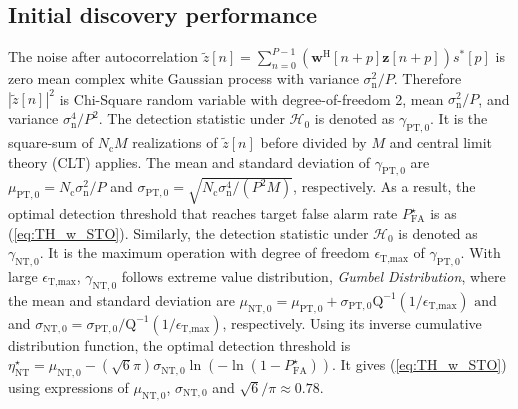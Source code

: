 \documentclass[journal]{IEEEtran}
\newcommand{\hermitian}[0]{\text{H}}
\newcommand{\Nc}[0]{N_{\text{c}}}
\newcommand{\sigman}[0]{\sigma_{\text{n}}}
\newcommand{\Q}[0]{\mathrm{Q}}
\begin{document}
\subsection{Initial discovery performance}
\label{appendix:detection_derivation_wo_STO}
The noise after autocorrelation $\tilde{z}[n] = \sum_{n=0}^{P-1}(\mathbf{w}^{\hermitian}[n+p]\mathbf{z}[n+p])s^{*}[p]$ is zero mean complex white Gaussian process with variance $\sigman^2/P$. Therefore $|\tilde{z}[n]|^2$ is Chi-Square random variable with degree-of-freedom 2, mean $\sigman^2/P$, and variance $\sigman^4/P^2$. The detection statistic under $\mathcal{H}_0$ is denoted as $\gamma_{\text{PT},0}$. It is the square-sum of $\Nc M$ realizations of $\tilde{z}[n]$ before divided by $M$ and central limit theory (CLT) applies. The mean and standard deviation of $\gamma_{\text{PT},0}$ are  $\mu_{\text{PT},0} =  \Nc\sigman^2/P$ and $\sigma_{\text{PT},0} =  \sqrt{\Nc\sigman^4/(P^2M)}$, respectively. As a result, the optimal detection threshold that reaches target false alarm rate $P^{\star}_{\text{FA}}$ is as (\ref{eq:TH_w_STO}). 
Similarly, the detection statistic under $\mathcal{H}_0$ is denoted as $\gamma_{\text{NT},0}$. It is the maximum operation with degree of freedom $\epsilon_{\text{T,max}}$ of $\gamma_{\text{PT},0}$. With large $\epsilon_{\text{T,max}}$, $\gamma_{\text{NT},0}$ follows extreme value distribution, \textit{Gumbel Distribution}, where the mean and standard deviation are 
$\mu_{\text{NT},0} = \mu_{\text{PT},0}+\sigma_{\text{PT},0}\Q^{-1}\left(1/\epsilon_{\text{T,max}}\right) \text{ and }$ and $\sigma_{\text{NT},0} = \sigma_{\text{PT},0}/\Q^{-1}\left(1/\epsilon_{\text{T,max}}\right)$, respectively.
Using its inverse cumulative distribution function, the optimal detection threshold is
$\eta^{\star}_{\text{NT}} = \mu_{\text{NT},0} - (\sqrt{6}\pi)\sigma_{\text{NT},0} \ln\left(-\ln\left(1-P^{\star}_{\text{FA}}\right)\right)$. It gives (\ref{eq:TH_w_STO}) using expressions of $\mu_{\text{NT},0}$, $\sigma_{\text{NT},0}$ and $\sqrt{6}/\pi\approx 0.78$.


\end{document}
